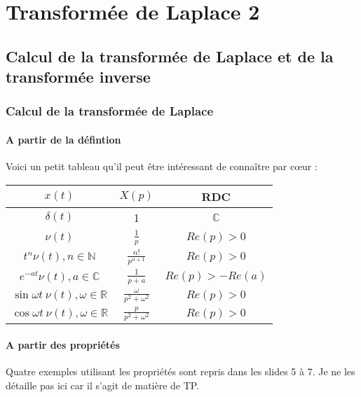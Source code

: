 \chapter{Transformée de Laplace 2}
\section{Calcul de la transformée de Laplace et de la transformée inverse}
	
\subsection{Calcul de la transformée de Laplace}
\subsubsection{A partir de la défintion}
Voici un petit tableau qu'il peut être intéressant de connaître par cœur :
\begin{center}
	\begin{tabular}{|c|c|c|}
		\hline 
		$x(t)$                                               & $X(p)$                        & RDC            \\ 
		\hline 
		$\delta(t)$                                          & 1                             & $\mathbb{C}$   \\ 
		\hline 
		$\nu(t)$                                             & $\frac{1}{p}$                 & $Re(p)>0$      \\ 
		\hline 
		$t^n\nu(t), n \in \mathbb{N}$                        & $\frac{n!}{p^{n+1}}$          & $Re(p)>0$      \\ 
		\hline 
		$e^{-at}\nu(t), a \in \mathbb{C}$                    & $\frac{1}{p+a}$               & $Re(p)>-Re(a)$ \\ 
		\hline 
		$\sin\omega t\ \nu(t), \omega \in \mathbb{R}$        & $\frac{\omega}{p^2+\omega^2}$ &                
		$Re(p)>0$ \\ 
		\hline $\cos\omega t\ \nu(t), \omega \in \mathbb{R}$ & $\frac{p}{p^2+\omega^2}$      &                
		$Re(p)>0$ \\ 
		\hline 
	\end{tabular} 
\end{center}
		
\subsubsection{A partir des propriétés}
Quatre exemples utilisant les propriétés sont repris dans les slides 5 à 7. Je ne 
les détaille pas ici car il s'agit de matière de TP.

